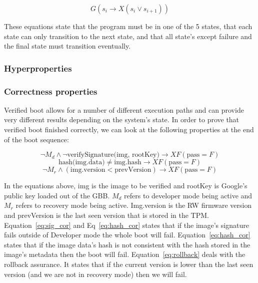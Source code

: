 \documentclass[../report.tex]{subfiles}
\begin{document}
\begin{equation}
    G(s_i \to X(s_i \lor s_{i+1}))
\end{equation}

These equations state that the program must be in one of the 5 states, that each state can only transition to the next state, and that all state's except failure and the final state must transition eventually.

\subsubsection{Hyperproperties}


\subsubsection{Correctness properties}

Verified boot allows for a number of different execution paths and can provide very different results depending on the system's state.
In order to prove that verified boot finished correctly, we can look at the following properties at the end of the boot sequence:

\begin{equation} \label{eq:sig_cor}
 \lnot M_d \land \lnot \text{verifySignature(img, rootKey)} \to XF (\text{pass} = F)
\end{equation}
\begin{equation} \label{eq:hash_cor}
    \text{hash(img.data)} \neq \text{img.hash} \to XF (\text{pass} = F)
\end{equation}
\begin{equation} \label{eq:rollback}
    \lnot M_r \land (\text{img.version} < \text{prevVersion}) \to XF (\text{pass} = F)
\end{equation}

In the equations above, img is the image to be verified and rootKey is Google's public key loaded out of the GBB.
$M_d$ refers to developer mode being active and $M_r$ refers to recovery mode being active.
Img.version is the RW firmware version and prevVersion is the last seen version that is stored in the TPM\@.
Equation~\ref{eq:sig_cor} and Eq~\ref{eq:hash_cor} states that if the image's signature fails outside of Developer mode the whole boot will fail.
Equation~\ref{eq:hash_cor} states that if the image data's hash is not consistent with the hash stored in the image's metadata then the boot will fail.
Equation~\ref{eq:rollback} deals with the rollback assurance. It states that if the current version is lower than the last seen version (and we are not in recovery mode) then we will fail.
\end{document}
